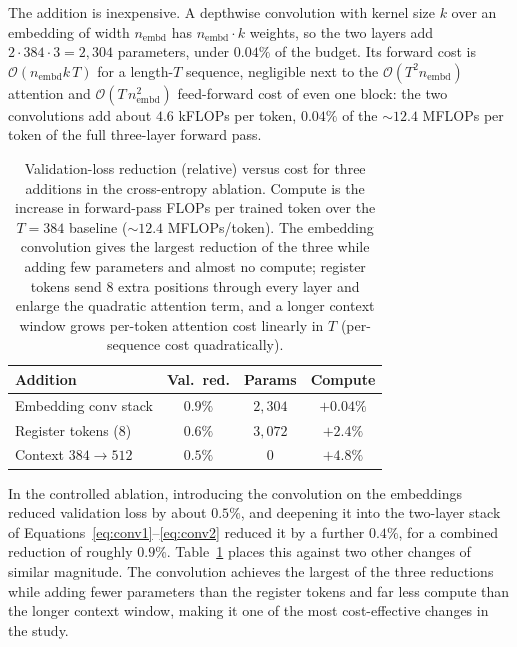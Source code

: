 \documentclass[11pt]{article}
\begin{document}
The addition is inexpensive. A depthwise convolution with kernel size $k$ over an
embedding of width $n_{\text{embd}}$ has $n_{\text{embd}}\cdot k$ weights, so the
two layers add $2 \cdot 384 \cdot 3 = 2{,}304$ parameters, under $0.04\%$ of the
budget. Its forward cost is $\mathcal{O}(n_{\text{embd}} k\, T)$ for a length-$T$
sequence, negligible next to the $\mathcal{O}(T^2 n_{\text{embd}})$ attention and
$\mathcal{O}(T\, n_{\text{embd}}^2)$ feed-forward cost of even one block: the two
convolutions add about $4.6$ kFLOPs per token, $0.04\%$ of the
${\sim}12.4$ MFLOPs per token of the full three-layer forward pass.

\begin{table}[t]
  \centering
  \small
  \setlength{\tabcolsep}{4pt}
  \begin{tabular}{lccc}
    \toprule
    \textbf{Addition} & \textbf{Val.\ red.} & \textbf{Params} & \textbf{Compute} \\
    \midrule
    Embedding conv stack   & $0.9\%$ & $2{,}304$ & $+0.04\%$ \\
    Register tokens ($8$)  & $0.6\%$ & $3{,}072$ & $+2.4\%$ \\
    Context $384{\to}512$  & $0.5\%$ & $0$       & $+4.8\%$ \\
    \bottomrule
  \end{tabular}
  \caption{Validation-loss reduction (relative) versus cost for three additions
  in the cross-entropy ablation. Compute is the increase in forward-pass FLOPs
  per trained token over the $T{=}384$ baseline (${\sim}12.4$ MFLOPs/token).
  The embedding convolution gives the largest reduction of the three while
  adding few parameters and almost no compute; register tokens send $8$ extra
  positions through every layer and enlarge the quadratic attention term, and a
  longer context window grows per-token attention cost linearly in $T$
  (per-sequence cost quadratically).}
  \label{tab:cost}
\end{table}

In the controlled ablation, introducing the convolution on the embeddings
reduced validation loss by about $0.5\%$, and deepening it into the two-layer
stack of Equations~\ref{eq:conv1}--\ref{eq:conv2} reduced it by a further
$0.4\%$, for a combined reduction of roughly $0.9\%$. Table~\ref{tab:cost} places
this against two other changes of similar magnitude. The convolution achieves the
largest of the three reductions while adding fewer parameters than the register
tokens and far less compute than the longer context window, making it one of the
most cost-effective changes in the study.
\end{document}
